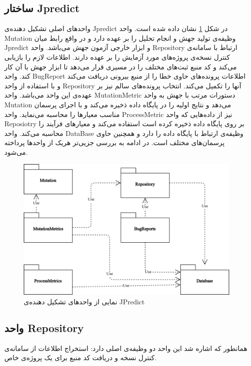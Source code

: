 \subsection{ساختار Jpredict}
واحدهای اصلی تشکیل دهنده‌ی Jpredict در شکل \ref{fig:jpredict-module} نشان داده شده‌ است. واحد Mutation وظیفه‌ی تولید جهش و انجام تحلیل را بر عهده دارد و در واقع رابط میان Jpredict و ابزار  خارجی آزمون جهش می‌باشد. واحد Repository ارتباط با سامانه‌ی کنترل نسخه‌ی پروژه‌های مورد آزمایش را بر عهده دارند. اطلاعات لازم را بازیابی می‌کند و کد منبع ثبت‌های مختلف را در مسیری قرار می‌دهد تا ابزار جهش با آن کار کند. واحد BugReport اطلاعات پرونده‌های حاوی خطا را از منبع بیرونی دریافت می‌کند و با استفاده از واحد Repository آنها را تکمیل می‌کند.  انتخاب پرونده‌های سالم نیز بر عهده‌ی این واحد می‌باشد. واحد MutationMetric دستورات مرتب با جهش به واحد Mutation می‌دهد و نتایج اولیه را در پایگاه داده ذخیره می‌کند و با اجرای پرسمان مناسب معیارها را محاسبه می‌نماید. واحد ProcessMetric نیز  از داده‌هایی که واحد Reposiotry بر روی پایگاه داده ذخیره کرده است استفاده می‌کند و معیارهای فرآیند را محاسبه می‌کند. واحد DataBase وظیفه‌ی ارتباط با پایگاه داده‌ را دارد و همچنین حاوی پرسمان‌های مختلف است. در ادامه به بررسی جزیی‌تر هریک از واحدها پرداخته می‌شود.


\begin{figure}[H]
	\centering
	\includegraphics[width=.8\textwidth]{img/method/component-jpredict.png}
	\caption{ نمایی از واحدهای تشکیل دهنده‌ی JPredict}
	\label{fig:jpredict-module}
\end{figure}

\subsection{واحد  Repository}
 
همانطور که اشاره شد این واحد دو وظیفه‌ی اصلی دارد: استخراج اطلاعات از سامانه‌ی کنترل نسخه و دریافت کد منبع برای یک پروژه‌ی خاص. 

